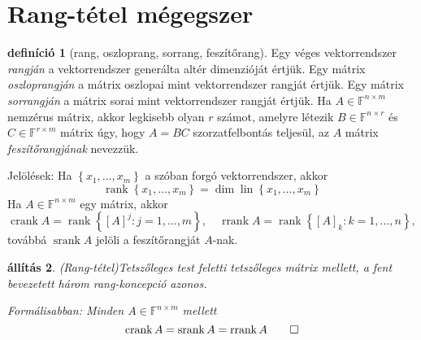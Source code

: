 \documentclass[9pt, a4paper, showtrims]{memoir}
\theoremstyle{plain}
\newtheorem{proposition}{állítás}[chapter]
\theoremstyle{remark}
\theoremstyle{definition}
\newtheorem{definition}[proposition]{definíció}
\DeclareMathOperator{\lin}{lin}
\DeclareMathOperator{\crank}{crank}
\DeclareMathOperator{\rrank}{rrank}
\DeclareMathOperator{\srank}{srank}
\DeclareMathOperator{\rank}{rank}
\begin{document}
\chapter*{Rang-tétel mégegszer}

\begin{definition}[rang, oszloprang, sorrang, feszítőrang]
    Egy véges vektorrendszer \emph{rangján} a vektorrendszer generálta altér dimenzióját értjük.
    Egy mátrix \emph{oszloprangján} a mátrix oszlopai mint vektorrendszer rangját értjük.
    Egy mátrix \emph{sorrangján} a mátrix sorai mint vektorrendszer rangját értjük.
    Ha $A\in\mathbb{F}^{n\times m}$ nemzérus mátrix,
    akkor legkisebb olyan $r$ számot, amelyre
    létezik $B\in\mathbb{F}^{n\times r}$ és $C\in\mathbb{F}^{r\times m}$ mátrix úgy, hogy 
    $A=BC$ szorzatfelbontás teljesül,
    az $A$ mátrix \emph{feszítőrangjának} nevezzük.

    Jelölések: Ha $\left\{ x_1,\dots,x_m \right\}$ a szóban forgó vektorrendszer, akkor
    \[
        \rank\left\{ x_1,\dots,x_m \right\}=\dim\lin\left\{ x_1,\dots,x_m \right\}
    \]
    Ha $A\in\mathbb{F}^{n\times m}$ egy mátrix,
    akkor 
    \[
        \crank{A}=\rank\left\{ [A]^{j}:j=1,\dots,m \right\},
        \quad
        \rrank{A}=\rank\left\{ [A]_k:k=1,\dots,n\right\},
    \]
    továbbá $\srank{A}$ jelöli a feszítőrangját $A$-nak.
\end{definition}
\begin{proposition}(Rang-tétel)\label{pr:rang}
    Tetszőleges test feletti tetszőleges mátrix mellett, a fent bevezetett három rang-koncepció azonos.

    Formálisabban: Minden $A\in\mathbb{F}^{n\times m}$ mellett
    \[
        \crank{A}=\srank{A}=\rrank{A}\qedhere
    \]
\end{proposition}
\end{document}
